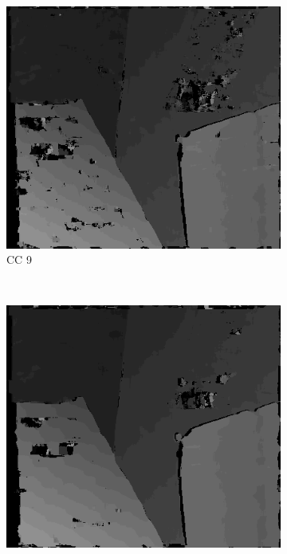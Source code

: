 \begin{figure}

  \begin{subfigure}[b]{0.23\textwidth}
    \centering
    \includegraphics[width=\textwidth]{images/stereo-pairs/venus_dual_crosschecked_9.png}
    \caption{CC 9}
  \end{subfigure}
  ~
  \begin{subfigure}[b]{0.23\textwidth}
    \centering
    \includegraphics[width=\textwidth]{images/stereo-pairs/venus_dual_crosschecked_13.png}

\end{subfigure}
\end{figure}
